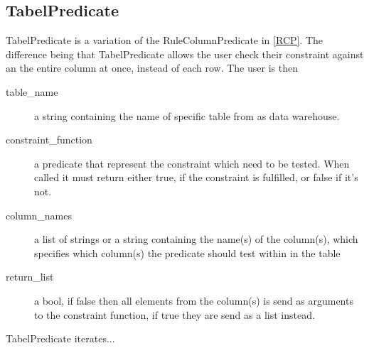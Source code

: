 \subsection{TabelPredicate}
TabelPredicate is a variation of the RuleColumnPredicate in \cref{RCP}. The difference being that TabelPredicate allows the user check their constraint against an the entire column at once, instead of each row. The user is then 


\begin{description}
\item [table\_name] a string containing the name of specific table from as data warehouse. 
\item [constraint\_function] a predicate that represent the constraint which need to be tested. When called it must return either true, if the constraint is fulfilled, or false if it's not.
\item [column\_names] a list of strings or a string containing the name(s) of the column(s), which specifies which column(s) the predicate should test within in the table
\item [return\_list] a bool, if false then all elements from the column(s) is send as arguments to the constraint function, if true they are send as a list instead.
\end{description}

TabelPredicate iterates...
